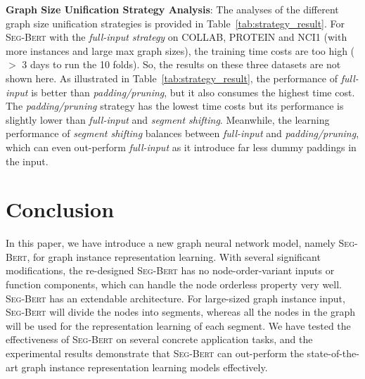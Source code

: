 \documentclass{article}
\newcommand{\our}{\textsc{Seg-Bert}}
\begin{document}
\noindent \textbf{Graph Size Unification Strategy Analysis}: The analyses of the different graph size unification strategies is provided in Table~\ref{tab:strategy_result}. For {\our} with the \textit{full-input strategy} on COLLAB, PROTEIN and NCI1 (with more instances and large max graph sizes), the training time costs are too high ($>$ 3 days to run the 10 folds). So, the results on these three datasets are not shown here. As illustrated in Table~\ref{tab:strategy_result}, the performance of \textit{full-input} is better than \textit{padding/pruning}, but it also consumes the highest time cost. The \textit{padding/pruning} strategy has the lowest time costs but its performance is slightly lower than \textit{full-input} and \textit{segment shifting}. Meanwhile, the learning performance of \textit{segment shifting} balances between \textit{full-input} and \textit{padding/pruning}, which can even out-perform \textit{full-input} as it introduce far less dummy paddings in the input.







































\section{Conclusion}\label{sec:conclusion}

In this paper, we have introduce a new graph neural network model, namely {\our}, for graph instance representation learning. With several significant modifications, the re-designed {\our} has no node-order-variant inputs or function components, which can handle the node orderless property very well. {\our} has an extendable architecture. For large-sized graph instance input, {\our} will divide the nodes into segments, whereas all the nodes in the graph will be used for the representation learning of each segment. We have tested the effectiveness of {\our} on several concrete application tasks, and the experimental results demonstrate that {\our} can out-perform the state-of-the-art graph instance representation learning models effectively.


\end{document}
